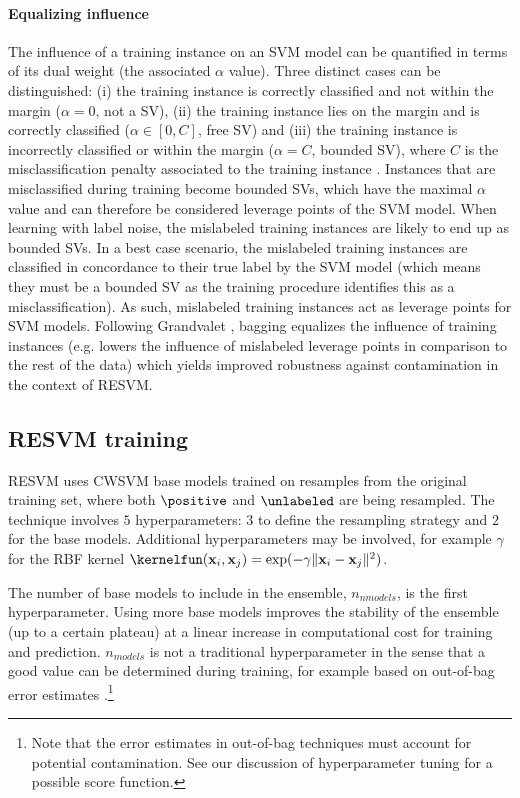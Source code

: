 \paragraph{Equalizing influence} The influence of a training instance on an SVM model can be quantified in terms of its dual weight (the associated $\alpha$ value). Three distinct cases can be distinguished: (i) the training instance is correctly classified and not within the margin ($\alpha = 0$, not a SV), (ii) the training instance lies on the margin and is correctly classified ($\alpha \in [0, C]$, free SV) and (iii) the training instance is incorrectly classified or within the margin ($\alpha = C$, bounded SV), where $C$ is the misclassification penalty associated to the training instance \citep{bottou07svm}. Instances that are misclassified during training become bounded SVs, which have the maximal $\alpha$ value and can therefore be considered leverage points of the SVM model. When learning with label noise, the mislabeled training instances are likely to end up as bounded SVs. In a best case scenario, the mislabeled training instances are classified in concordance to their true label by the SVM model (which means they must be a bounded SV as the training procedure identifies this as a misclassification). As such, mislabeled training instances act as leverage points for SVM models. Following Grandvalet \citep{grandvalet2004bagging}, bagging equalizes the influence of training instances (e.g. lowers the influence of mislabeled leverage points in comparison to the rest of the data) which yields improved robustness against contamination in the context of RESVM. 


\subsection{RESVM training}
RESVM uses CWSVM base models trained on resamples from the original training set, where both $\positive$ and $\unlabeled$ are being resampled. The technique involves $5$ hyperparameters: $3$ to define the resampling strategy and $2$ for the base models. Additional hyperparameters may be involved, for example $\gamma$ for the RBF kernel $\kernelfun(\mathbf{x}_i, \mathbf{x}_j) = \exp(-\gamma \| \mathbf{x}_i-\mathbf{x}_j\|^2)$.

The number of base models to include in the ensemble, $n_{nmodels}$, is the first hyperparameter. Using more base models improves the stability of the ensemble (up to a certain plateau) at a linear increase in computational cost for training and prediction. $n_{models}$ is not a traditional hyperparameter in the sense that a good value can be determined during training, for example based on out-of-bag error estimates \citep{banfield2007comparison}.\footnote{\label{labelednote}Note that the error estimates in out-of-bag techniques must account for potential contamination. See our discussion of hyperparameter tuning for a possible score function.}


